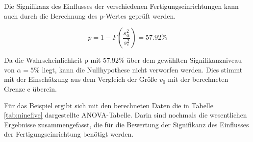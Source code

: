 \noindent Die Signifikanz des Einflusses der verschiedenen Fertigungseinrichtungen kann auch durch die Berechnung des p-Wertes gepr\"{u}ft werden. 

\begin{equation}\label{eq:ninetwentyfour}
p=1-F\left(\dfrac{s_{\alpha}^{2}}{s_{\varepsilon}^{2}} \right)=57.92\%
\end{equation}

\noindent Da die Wahrscheinlichkeit p mit 57.92\% \"{u}ber dem gew\"{a}hlten Signifikanzniveau von $\alpha= 5\% $ liegt, kann die Nullhypothese nicht verworfen werden. Dies stimmt mit der Einsch\"{a}tzung aus dem Vergleich der Gr\"{o}{\ss}e $v_{0}$ mit der berechneten Grenze c \"{u}berein.\newline

\noindent F\"{u}r das Beispiel ergibt sich mit den berechneten Daten die in Tabelle \ref{tab:ninefive} dargestellte ANOVA-Tabelle. Darin sind nochmals die wesentlichen Ergebnisse zusammengefasst, die f\"{u}r die Bewertung der Signifikanz des Einflusses der Fertigungseinrichtung ben\"{o}tigt werden.

